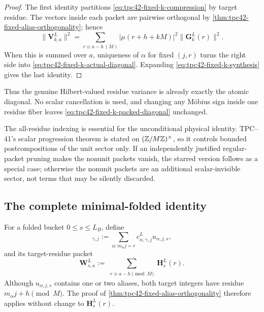 \begin{proof}
The first identity partitions \eqref{eq:tpc42-fixed-k-compression} by
target residue.  The vectors inside each packet are pairwise orthogonal by
\cref{thm:tpc42-fixed-alias-orthogonality}; hence
\begin{equation}
 \|\mathbf V_{k,a}^L\|^2
 =\sum_{r\equiv a-h\, (M)}
  |\mu(r+h+kM)|^2\|\mathbf G_k^L(r)\|^2.
 \label{eq:tpc42-one-packet-norm}
\end{equation}
When this is summed over \(a\), uniqueness of \(\alpha\) for fixed
\((j,r)\) turns the right side into
\eqref{eq:tpc42-fixed-k-actual-diagonal}.  Expanding
\eqref{eq:tpc42-fixed-k-synthesis} gives the last identity.
\end{proof}

Thus the genuine Hilbert-valued residue variance is already exactly the
atomic diagonal.  No scalar cancellation is used, and changing any
M\"obius sign inside one residue fiber leaves
\eqref{eq:tpc42-fixed-k-packed-diagonal} unchanged.

The all-residue indexing is essential for the unconditional physical
identity.  TPC--41's scalar progression theorem is stated on
\((\mathbb Z/M\mathbb Z)^\times\), so it controls bounded postcompositions of the unit
sector only.  If an independently justified regular-packet pruning makes
the nonunit packets vanish, the starred version follows as a special
case; otherwise the nonunit packets are an additional scalar-invisible
sector, not terms that may be silently discarded.

\subsection{The complete minimal-folded identity}

For a folded bucket \(0\le s\le L_B\), define
\begin{equation}
 [\mathbf H_s^L(r)]_{\gamma,j}
 :=\sum_{\alpha:m_\alpha j=r}
 c^L_{\alpha,\gamma,j}u_{\alpha,j,s},
 \label{eq:tpc42-folded-H}
\end{equation}
and its target-residue packet
\begin{equation}
 \mathbf W_{s,a}^L
 :=\sum_{\substack{r\equiv a-h\!\!\!\pmod M}}
 \mathbf H_s^L(r).
 \label{eq:tpc42-folded-residue-packet}
\end{equation}
Although \(u_{\alpha,j,s}\) contains one or two aliases, both target
integers have residue \(m_\alpha j+h\pmod M\).  The proof of
\cref{thm:tpc42-fixed-alias-orthogonality} therefore applies without
change to \(\mathbf H_s^L(r)\).

